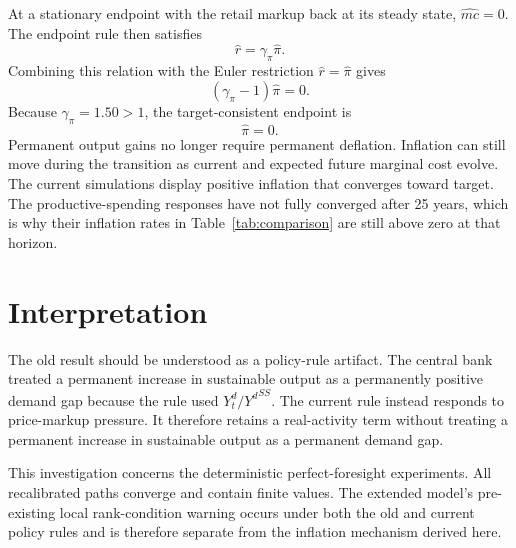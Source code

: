 \documentclass[10pt]{article}
\newcommand{\ssval}[1]{{#1}^{SS}}
\begin{document}
At a stationary endpoint with the retail markup back at its steady state,
$\widehat{mc}=0$.
The endpoint rule then satisfies
\begin{equation}
    \widehat r=\gamma_\pi\widehat\pi.
\end{equation}
Combining this relation with the Euler restriction
$\widehat r=\widehat\pi$ gives
\begin{equation}
    (\gamma_\pi-1)\widehat\pi=0.
\end{equation}
Because $\gamma_\pi=1.50>1$, the target-consistent endpoint is
\begin{equation}
    \boxed{\widehat\pi=0}.
\end{equation}
Permanent output gains no longer require permanent deflation.
Inflation can still move during the transition as current and expected future marginal
cost evolve.
The current simulations display positive inflation that converges toward target.
The productive-spending responses have not fully converged after 25 years, which is why
their inflation rates in Table~\ref{tab:comparison} are still above zero at that horizon.

\section{Interpretation}

The old result should be understood as a policy-rule artifact.
The central bank treated a permanent increase in sustainable output as a permanently
positive demand gap because the rule used $Y_t^d/\ssval{Y^d}$.
The current rule instead responds to price-markup pressure.
It therefore retains a real-activity term without treating a permanent increase in
sustainable output as a permanent demand gap.

This investigation concerns the deterministic perfect-foresight experiments.
All recalibrated paths converge and contain finite values.
The extended model's pre-existing local rank-condition warning occurs under both the old
and current policy rules and is therefore separate from the inflation mechanism derived
here.
\end{document}
